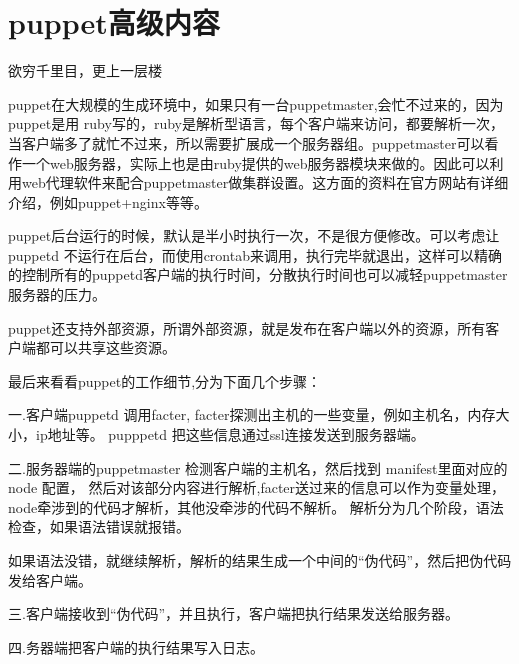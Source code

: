 \chapter{\msyh puppet高级内容}
\begin{center}
\kai
欲穷千里目，更上一层楼
\end{center}
\par
puppet在大规模的生成环境中，如果只有一台puppetmaster,会忙不过来的，因为puppet是用 ruby写的，ruby是解析型语言，每个客户端来访问，都要解析一次，当客户端多了就忙不过来，所以需要扩展成一个服务器组。puppetmaster可以看作一个web服务器，实际上也是由ruby提供的web服务器模块来做的。因此可以利用web代理软件来配合puppetmaster做集群设置。这方面的资料在官方网站有详细介绍，例如puppet+nginx等等。\par
puppet后台运行的时候，默认是半小时执行一次，不是很方便修改。可以考虑让 puppetd 不运行在后台，而使用crontab来调用，执行完毕就退出，这样可以精确的控制所有的puppetd客户端的执行时间，分散执行时间也可以减轻puppetmaster服务器的压力。\par
puppet还支持外部资源，所谓外部资源，就是发布在客户端以外的资源，所有客户端都可以共享这些资源。\par
最后来看看puppet的工作细节,分为下面几个步骤：\par
一.客户端puppetd 调用facter, facter探测出主机的一些变量，例如主机名，内存大小，ip地址等。 pupppetd 把这些信息通过ssl连接发送到服务器端。\par
二.服务器端的puppetmaster 检测客户端的主机名，然后找到 manifest里面对应的 node 配置， 然后对该部分内容进行解析,facter送过来的信息可以作为变量处理，node牵涉到的代码才解析，其他没牵涉的代码不解析。 解析分为几个阶段，语法检查，如果语法错误就报错。\par
如果语法没错，就继续解析，解析的结果生成一个中间的“伪代码”，然后把伪代码发给客户端。\par
三.客户端接收到“伪代码”，并且执行，客户端把执行结果发送给服务器。\par
四.务器端把客户端的执行结果写入日志。\par

